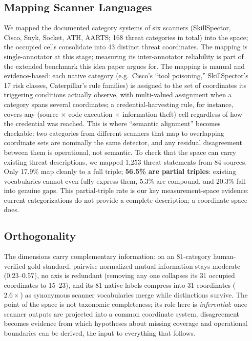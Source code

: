 \documentclass[sigconf,nonacm]{acmart}
\begin{document}
\subsection{Mapping Scanner Languages}
We mapped the documented category systems of six scanners (SkillSpector, Cisco, Snyk, Socket, ATH, AARTS; 168 threat categories in total) into the space; the occupied cells consolidate into 43 distinct threat coordinates. The mapping is single-annotator at this stage; measuring its inter-annotator reliability is part of the extended benchmark this idea paper argues for. The mapping is manual and evidence-based: each native category (e.g.\ Cisco's ``tool poisoning,'' SkillSpector's 17 risk classes, Caterpillar's rule families) is assigned to the set of coordinates its triggering conditions actually observe, with multi-valued assignment when a category spans several coordinates; a credential-harvesting rule, for instance, covers any (source $\times$ code execution $\times$ information theft) cell regardless of how the credential was reached. This is where ``semantic alignment'' becomes checkable: two categories from different scanners that map to overlapping coordinate sets are nominally the same detector, and any residual disagreement between them is operational, not semantic. To check that the space can carry existing threat descriptions, we mapped 1{,}253 threat statements from 84 sources. Only 17.9\% map cleanly to a full triple; \textbf{56.5\% are partial triples}: existing vocabularies cannot even fully express them, 5.3\% are compound, and 20.3\% fall into genuine gaps. This partial-triple rate is our key measurement-space evidence: current categorizations do not provide a complete description; a coordinate space does.

\subsection{Orthogonality}
The dimensions carry complementary information: on an 81-category human-verified gold standard, pairwise normalized mutual information stays moderate (0.23--0.57), no axis is redundant (removing any one collapses its 31 occupied coordinates to 15--23), and its 81 native labels compress into 31 coordinates ($2.6\times$) as synonymous scanner vocabularies merge while distinctions survive. The point of the space is not taxonomic completeness; its role here is \emph{inferential}: once scanner outputs are projected into a common coordinate system, disagreement becomes evidence from which hypotheses about missing coverage and operational boundaries can be derived, the input to everything that follows.
\end{document}
